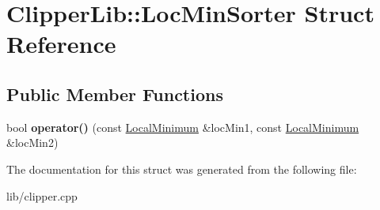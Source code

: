 \hypertarget{struct_clipper_lib_1_1_loc_min_sorter}{}\section{Clipper\+Lib\+:\+:Loc\+Min\+Sorter Struct Reference}
\label{struct_clipper_lib_1_1_loc_min_sorter}
\subsection*{Public Member Functions}
\begin{DoxyCompactItemize}
\item 
\mbox{\label{struct_clipper_lib_1_1_loc_min_sorter_a4e5cd20cdd73b95700e91e61a8de5c06}} 
bool {\bfseries operator()} (const \hyperlink{struct_clipper_lib_1_1_local_minimum}{Local\+Minimum} \&loc\+Min1, const \hyperlink{struct_clipper_lib_1_1_local_minimum}{Local\+Minimum} \&loc\+Min2)
\end{DoxyCompactItemize}


The documentation for this struct was generated from the following file\+:\begin{DoxyCompactItemize}
\item 
lib/clipper.\+cpp\end{DoxyCompactItemize}
